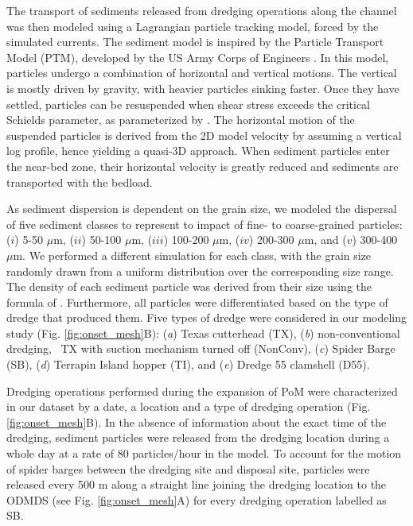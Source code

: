 The transport of sediments released from dredging operations along the channel was then modeled using a Lagrangian particle tracking model, forced by the simulated currents. The sediment model is inspired by the Particle Transport Model (PTM), developed by the US Army Corps of Engineers \citep{macdonald2006ptm}. In this model, particles undergo a combination of horizontal and vertical motions. The vertical is mostly driven by gravity, with heavier particles sinking faster. Once they have settled, particles can be resuspended when shear stress exceeds   the critical Schields parameter, as parameterized by \cite{soulsby1997threshold}. The horizontal motion of the suspended particles is derived from the 2D model velocity by assuming a vertical log profile, hence yielding a quasi-3D approach. When sediment particles enter the near-bed zone, their horizontal velocity is greatly reduced and sediments are transported with the bedload.   

As sediment dispersion is dependent on the grain size, we modeled the dispersal of five sediment classes to represent to impact of fine- to coarse-grained particles: ($i$) 5-50 $\mu$m, ($ii$) 50-100 $\mu$m, ($iii$) 100-200 $\mu$m, ($iv$) 200-300 $\mu$m, and ($v$) 300-400 $\mu$m. We performed a  different simulation for each class, with the grain size randomly drawn from a uniform distribution over the corresponding size range. The density of each sediment particle was derived from their size using the formula of \cite{hamilton1982sound}. Furthermore, all particles were differentiated based on the type of dredge that produced them. Five types of dredge were considered in our modeling study (Fig. \ref{fig:onset_mesh}B): (\textit{a}) Texas cutterhead (TX), (\textit{b}) non-conventional dredging, \ie~TX with suction mechanism turned off (NonConv), (\textit{c}) Spider Barge (SB), (\textit{d}) Terrapin Island hopper (TI), and (\textit{e}) Dredge 55 clamshell (D55).

Dredging operations performed during the expansion of PoM were characterized in our dataset by a date, a location and  a type of dredging operation (Fig. \ref{fig:onset_mesh}B). In the absence of information about the exact time of the dredging, sediment particles were released from the dredging location during a whole day at a rate of 80 particles/hour in the model. To account for the motion of spider barges between the dredging site and disposal site, particles were released every 500 m along a straight line joining the dredging location to the ODMDS (see Fig. \ref{fig:onset_mesh}A) for every dredging operation labelled as SB.

